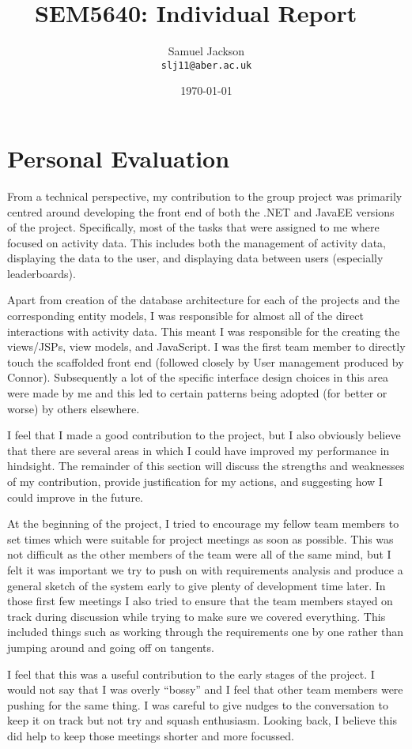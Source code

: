 \documentclass[paper=a4, fontsize=11pt]{scrartcl}	%
\title{
	\vspace{-0.5in} 	\usefont{OT1}{bch}{b}{n}
	 SEM5640: Individual Report \
}
\author{
	\usefont{OT1}{bch}{m}{n} Samuel Jackson
	\\   \texttt{slj11@aber.ac.uk}
}
\date{\today}
\numberwithin{equation}{section}															%
\numberwithin{figure}{section}																%
\numberwithin{table}{section}
\begin{document}
\maketitle
\section*{Personal Evaluation}
From a technical perspective, my contribution to the group project was primarily centred around developing the front end of both the .NET and JavaEE versions of the project. Specifically, most of the tasks that were assigned to me where focused on activity data. This includes both the management of activity data, displaying the data to the user, and displaying data between users (especially leaderboards).

Apart from creation of the database architecture for each of the projects and the corresponding entity models, I was responsible for almost all of the direct interactions with activity data. This meant I was responsible for the creating the views/JSPs, view models, and JavaScript. I was the first team member to directly touch the scaffolded front end (followed closely by User management produced by Connor). Subsequently a lot of the specific interface design choices in this area were made by me and this led to certain patterns being adopted (for better or worse) by others elsewhere.

I feel that I made a good contribution to the project, but I also obviously believe that there are several areas in which I could have improved my performance in hindsight. The remainder of this section will discuss the strengths and weaknesses of my contribution, provide justification for my actions, and suggesting how I could improve in the future.

At the beginning of the project, I tried to encourage my fellow team members to set times which were suitable for project meetings as soon as possible. This was not difficult as the other members of the team were all of the same mind, but I felt it was important we try to push on with requirements analysis and produce a general sketch of the system early to give plenty of development time later. In those first few meetings I also tried to ensure that the team members stayed on track during discussion while trying to make sure we covered everything. This included things such as working through the requirements one by one rather than jumping around and going off on tangents.

I feel that this was a useful contribution to the early stages of the project. I would not say that I was overly ``bossy'' and I feel that other team members were pushing for the same thing. I was careful to give nudges to the conversation to keep it on track but not try and squash enthusiasm. Looking back, I believe this did help to keep those meetings shorter and more focussed.
\end{document}
